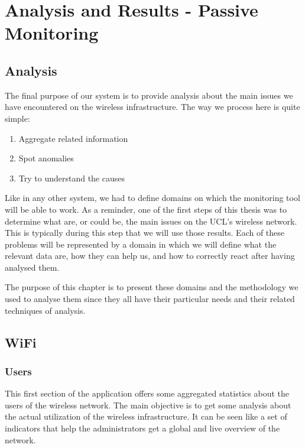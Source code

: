 
\chapter{Analysis and Results - Passive Monitoring} %

\label{Chapter5} %


\section{Analysis}
The final purpose of our system is to provide analysis about the main issues we have encountered on the wireless infrastructure. The way we process here is quite simple:

\begin{enumerate}
\item Aggregate related information
\item Spot anomalies
\item Try to understand the causes
\end{enumerate}

Like in any other system, we had to define domains on which the monitoring tool will be able to work. As a reminder, one of the first steps of this thesis was to determine what are, or could be, the main issues on the UCL's wireless network. This is typically during this step that we will use those results. Each of these problems will be represented by a domain in which we will define what the relevant data are, how they can help us, and how to correctly react after having analysed them. 

The purpose of this chapter is to present these domains and the methodology we used to analyse them since they all have their particular needs and their related techniques of analysis.

\section{WiFi}

\subsection{Users}
This first section of the application offers some aggregated statistics about the users of the wireless network. The main objective is to get some analysis about the actual utilization of the wireless infrastructure. It can be seen like a set of indicators that help the administrators get a global and live overview of the network. 

